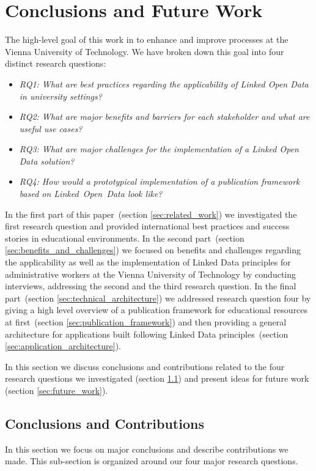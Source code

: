 \documentclass{article}
\begin{document}
\section{Conclusions and Future Work}
The high-level goal of this work in to enhance and improve processes at the Vienna University of Technology. We have broken down this goal
into four distinct research questions:
\begin{itemize}
	\item \textit{RQ1: What are best practices regarding the applicability of Linked Open Data in university settings?}
	\item \textit{RQ2: What are major benefits and barriers for each stakeholder and what are useful use cases?}
	\item \textit{RQ3: What are major challenges for the implementation of a Linked Open Data solution?}
	\item \textit{RQ4: How would a prototypical implementation of a publication framework based on Linked~Open~Data look like?}
\end{itemize}
In the first part of this paper~(section \ref{sec:related_work}) we investigated the first research question and provided international best practices and success stories 
in educational environments. In the second part~(section \ref{sec:benefits_and_challenges}) we focused on benefits and challenges regarding the applicability as well as
the implementation of Linked Data principles for administrative workers at the Vienna University of Technology by conducting interviews, addressing the second and the third research question. In the final part~(section \ref{sec:technical_architecture}) we addressed research question four by giving a high level overview of a publication framework for educational resources at first~(section \ref{sec:publication_framework}) and then providing a general architecture for applications built following Linked Data principles~(section \ref{sec:application_architecture}). 

In this section we discuss conclusions and contributions related to the four research questions we investigated (section \ref{sec:conclusions}) and present ideas for future work (section \ref{sec:future_work}). 
\subsection{Conclusions and Contributions}
\label{sec:conclusions}
In this section we focus on major conclusions and describe contributions we made. This sub-section is organized around our four major research questions.
\end{document}
